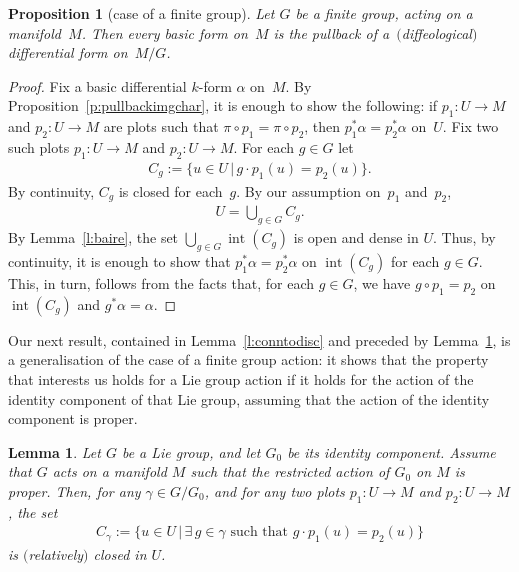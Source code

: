 \documentclass[pdftex]{sigma}
\numberwithin{equation}{section}
\newtheorem{Lemma}[Theorem]{Lemma}
\newtheorem{Proposition}[Theorem]{Proposition}
\newcommand{\inter}{{\operatorname{int}}} %
\newcommand{\hypref}[2]{{#2~\ref{#1}}}
\begin{document}
\begin{Proposition}[case of a f\/inite group] \label{p:finite}
Let $G$ be a finite group, acting on a manifold~$M$.
Then every basic form on~$M$ is the pullback of a~$($diffeological$)$ differential form on~$M/G$.
\end{Proposition}

\begin{proof}
Fix a basic dif\/ferential $k$-form $\alpha$ on~$M$.
By \hypref{p:pullbackimgchar}{Proposition},
it is enough to show the following:
if $p_1 \colon U \to M$ and $p_2 \colon U \to M$ are plots
such that $\pi \circ p_1 = \pi \circ p_2$,
then $p_1^* \alpha = p_2^*\alpha$ on~$U$.
Fix two such plots $p_1 \colon U \to M$ and $p_2 \colon U \to M$.
For each $g \in G$ let
\begin{gather*} C_g := \{ u \in U\,|\, g \cdot p_1(u) = p_2(u) \}.\end{gather*}
By continuity, $C_g$ is closed for each~$g$.
By our assumption on~$p_1$ and~$p_2$,
\begin{gather*} U = \bigcup_{g\in G} C_g. \end{gather*}
By \hypref{l:baire}{Lemma},
the set $\bigcup_{g \in G} \inter(C_g)$
is open and dense in $U$. Thus, by continuity, it is enough to show
that $p_1^* \alpha = p_2^*\alpha$ on $\inter(C_g)$ for each $g \in G$. This, in turn, follows from the facts that, for each $g\in G$, we have $g\circ p_1=p_2$ on $\inter(C_g)$ and $g^*\alpha=\alpha$.
\end{proof}

Our next result, contained in \hypref{l:conntodisc}{Lemma}
and preceded by \hypref{l:C closed}{Lemma},
is a generalisation of the case of a f\/inite group action:
it shows that the property that interests us
holds for a Lie group action
if it holds for the action of the identity component of that
Lie group, assuming that the action of the identity component is proper.


\begin{Lemma}\label{l:C closed}
Let $G$ be a Lie group, and let $G_0$ be its identity component.
Assume that $G$ acts on a manifold $M$ such that the restricted action
of $G_0$ on $M$ is proper. Then, for any $\gamma\in G/G_0$,
and for any two plots $p_1 \colon U \to M$ and $p_2 \colon U \to M$, the set
\begin{gather*} C_\gamma := \{ u \in U\,|\, \exists\, g \in\gamma\text{ such that }
 g\cdot p_1(u)=p_2(u)\}\end{gather*}
is $($relatively$)$ closed in $U$.
\end{Lemma}
\end{document}
